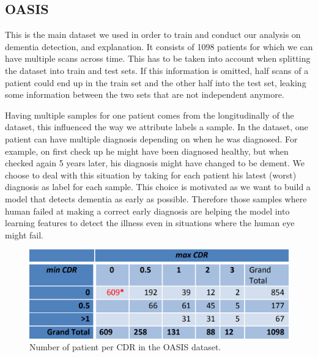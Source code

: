 \subsection{OASIS}
\label{sec:OASIS}
This is the main dataset we used in order to train and conduct our analysis on dementia detection, and explanation. It consists of 1098 patients for which we can have multiple scans across time. This has to be taken into account when splitting the dataset into train and test sets. If this information is omitted, half scans of a patient could end up in the train set and the other half into the test set, leaking some information between the two sets that are not independent anymore.


Having multiple samples for one patient comes from the longitudinally of the dataset, this influenced the way we attribute labels a sample. In the dataset, one patient can have multiple diagnosis depending on when he was diagnosed. For example, on first check up he might have been diagnosed healthy, but when checked again 5 years later, his diagnosis might have changed to be dement. We choose to deal with this situation by taking for each patient his latest (worst) diagnosis as label for each sample. This choice is motivated as we want to build a model that detects dementia as early as possible. Therefore those samples where human failed at making a correct early diagnosis are helping the model into learning features to detect the illness even in situations where the human eye might fail.
\begin{figure}
 \centering
 \includegraphics[width=.9\linewidth]{figures/dataset/OASIS_CDR_table.png}
 \captionsetup{width=.9\linewidth}
 \caption[OASIS_CDR_table]{Number of patient per CDR in the OASIS dataset\footnotemark{}.}
 \label{fig:OASIS_CDR_table}
\end{figure}
